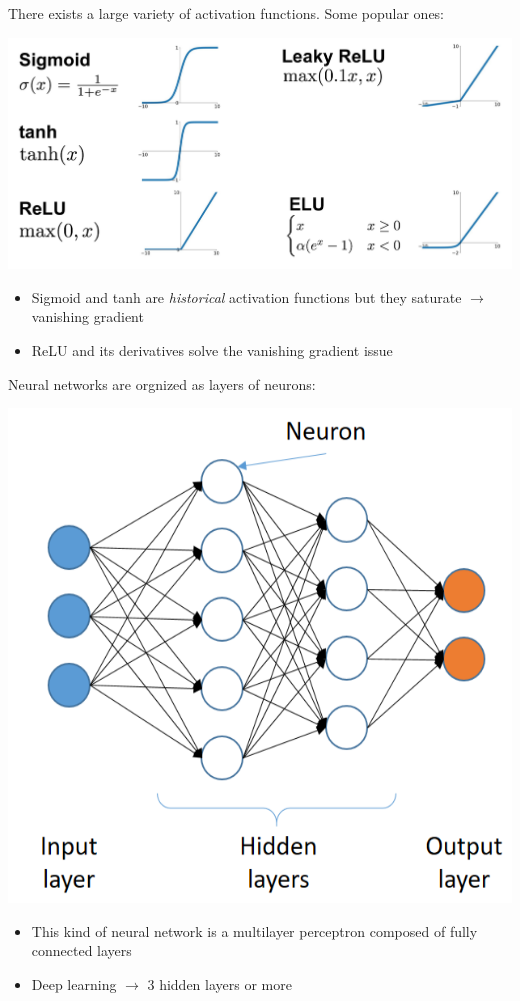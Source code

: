 \documentclass[usenames,dvipsnames]{beamer}
\begin{document}
    \begin{frame}{\secname}{\subsecname}
        There exists a large variety of activation functions. Some popular ones:
        \begin{center}
            \includegraphics[width=0.9\linewidth]{figures/DL_fundamentals/activation-func.png}
        \end{center}
        \vspace{-1em}
        \begin{itemize}
            \item Sigmoid and tanh are \textit{historical} activation functions but they saturate $\rightarrow$ vanishing gradient
            \item ReLU and its derivatives solve the vanishing gradient issue
        \end{itemize}
    \end{frame}
    \begin{frame}{\secname}{\subsecname}
        Neural networks are orgnized as layers of neurons:
        \vspace{-0.8em}
        \begin{center}
            \includegraphics[width=0.45\linewidth]{figures/DL_fundamentals/artificial_neural_network.png}
        \end{center}
        \vspace{-1em}
        \begin{itemize}
            \item This kind of neural network is a \alert{multilayer perceptron} composed of \alert{fully connected layers}
            \item Deep learning $\rightarrow$ 3 \alert{hidden layers} or more
        \end{itemize}
    \end{frame}
    
\end{document}
